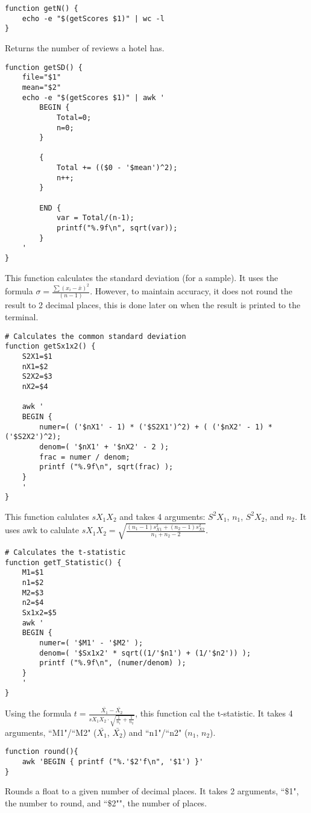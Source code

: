 \documentclass[a4paper]{article}
\begin{document}
\begin{lstlisting}
function getN() {
	echo -e "$(getScores $1)" | wc -l
}
\end{lstlisting}
Returns the number of reviews a hotel has.

\begin{lstlisting}
function getSD() {
	file="$1"
	mean="$2"
	echo -e "$(getScores $1)" | awk '
		BEGIN {
			Total=0;
			n=0;
		}

		{
			Total += (($0 - '$mean')^2);
			n++;
		}

		END {
			var = Total/(n-1);
			printf("%.9f\n", sqrt(var));
		}
	'
}
\end{lstlisting}
This function calculates the standard deviation (for a sample).
It uses the formula $\sigma = \frac{\sum{(x_i - \bar{x})^2}}{(n-1)}$.
However, to maintain accuracy, it does not round the result to 2 decimal places, this is done later on when the result is printed to the terminal.

\begin{lstlisting}
# Calculates the common standard deviation
function getSx1x2() {
	S2X1=$1
	nX1=$2
	S2X2=$3
	nX2=$4

	awk '
	BEGIN {
		numer=( ('$nX1' - 1) * ('$S2X1')^2) + ( ('$nX2' - 1) * ('$S2X2')^2);
		denom=( '$nX1' + '$nX2' - 2 );
		frac = numer / denom;
		printf ("%.9f\n", sqrt(frac) );
	}
	'
}
\end{lstlisting}
This function calulates $s X_1 X_2$ and takes 4 arguments: $S^2X_1$, $n_1$, $S^2X_2$, and  $n_2$.
It uses awk to calulate $s X_1 X_2 = \sqrt{\frac{(n_1 - 1)s^{2}_{X1} + (n_2 - 1)s^{2}_{X2}}{n_1 + n_2 - 2}}$.

\begin{lstlisting}
# Calculates the t-statistic
function getT_Statistic() {
	M1=$1
	n1=$2
	M2=$3
	n2=$4
	Sx1x2=$5
	awk '
	BEGIN {
		numer=( '$M1' - '$M2' );
		denom=( '$Sx1x2' * sqrt((1/'$n1') + (1/'$n2')) );
		printf ("%.9f\n", (numer/denom) );
	}
	'
}
\end{lstlisting}
Using the formula $t = \frac{\bar{X_1} - \bar{X_2}}{s X_1 X_2 \cdot \sqrt{\frac{1}{n_1} + \frac{1}{n_2}}}$, this function cal the t-statistic.
It takes 4 arguments, ``M1"/``M2" ($\bar{X_1}$, $\bar{X_2}$) and ``n1"/``n2" ($n_1$, $n_2$).

\begin{lstlisting}
function round(){
	awk 'BEGIN { printf ("%.'$2'f\n", '$1') }'
}
\end{lstlisting}
Rounds a float to a given number of decimal places.
It takes 2 arguments, ``\$1", the number to round, and ``\$2"", the number of places.
\end{document}
